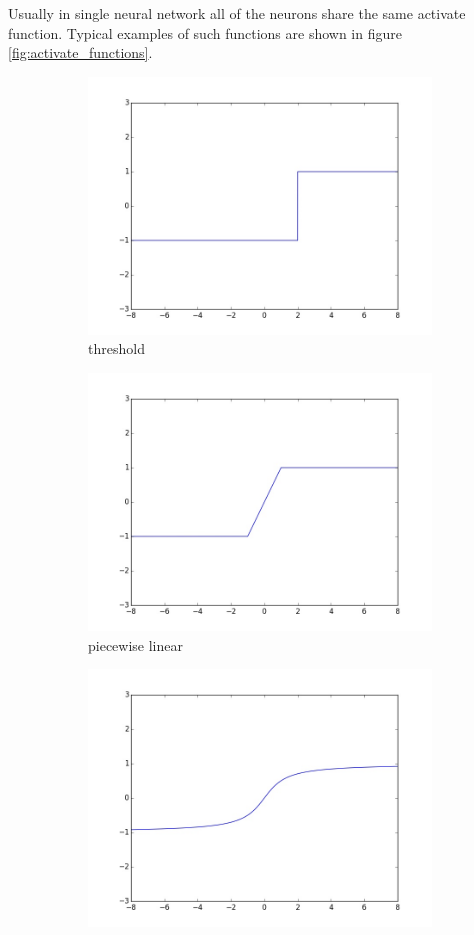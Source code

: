 \documentclass[magister]{dyplom}
\begin{document}
	Usually in single neural network all of the neurons share the same activate function. Typical examples of such functions are shown in figure \ref{fig:activate_functions}. \\
	
	\begin{figure}
		\centering
		\begin{subfigure}{.33\textwidth}
			\centering
			\includegraphics[width=.8\linewidth]{images/act_func_threshold}
			\caption{threshold}
		\end{subfigure}%
		\begin{subfigure}{.33\textwidth}
			\centering
			\includegraphics[width=.8\linewidth]{images/act_func_piecewise_lin}
			\caption{piecewise linear}
		\end{subfigure}
		\begin{subfigure}{.33\textwidth}
			\centering
			\includegraphics[width=.8\linewidth]{images/act_func_atan}

\end{subfigure}
\end{figure}
\end{document}
